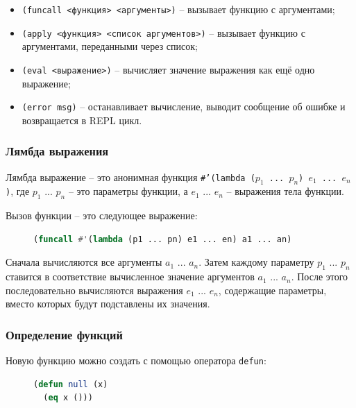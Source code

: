 \begin{itemize}
\paragraph{Другие примитивы}

\item \texttt{(funcall <функция> <аргументы>)} -- вызывает функцию с аргументами;
\item \texttt{(apply <функция> <список аргументов>)} -- вызывает функцию с аргументами, переданными через список;
\item \texttt{(eval <выражение>)} -- вычисляет значение выражения как ещё одно выражение;
\item \texttt{(error msg)} -- останавливает вычисление, выводит сообщение об ошибке и возвращается в REPL цикл.

\end{itemize}

\subsubsection{Лямбда выражения}

Лямбда выражение -- это анонимная функция \texttt{\#'(lambda ($p_1$ ... $p_n$) $e_1$ ... $e_n$)}, где $p_1$ ... $p_n$ -- это параметры функции, а $e_1$ ... $e_n$ -- выражения тела функции.

Вызов функции -- это следующее выражение:

\begin{figure}[H]
\begin{lstlisting}[language=Lisp]
(funcall #'(lambda (p1 ... pn) e1 ... en) a1 ... an)
\end{lstlisting}
\end{figure}

Сначала вычисляются все аргументы $a_1$ ... $a_n$. Затем каждому параметру $p_1$ ... $p_n$ ставится в соответствие вычисленное значение аргументов $a_1$ ... $a_n$. После этого последовательно вычисляются выражения $e_1$ ... $e_n$, содержащие параметры, вместо которых будут подставлены их значения.

\subsubsection{Определение функций}

Новую функцию можно создать с помощью оператора \texttt{defun}:

\begin{figure}[H]
\begin{lstlisting}[language=Lisp]
(defun null (x)
  (eq x ()))
\end{lstlisting}
\end{figure}

